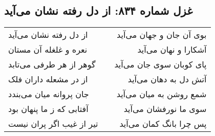 \begin{center}
\section*{غزل شماره ۸۳۴: از دل رفته نشان می‌آید}
\label{sec:0834}
\begin{longtable}{l p{0.5cm} r}
از دل رفته نشان می‌آید
&&
بوی آن جان و جهان می‌آید
\\
نعره و غلغله آن مستان
&&
آشکارا و نهان می‌آید
\\
گوهر از هر طرفی می‌تابد
&&
پای کوبان سوی جان می‌آید
\\
از در مشعله داران فلک
&&
آتش دل به دهان می‌آید
\\
جان پروانه میان می‌بندد
&&
شمع روشن به میان می‌آید
\\
آفتابی که ز ما پنهان بود
&&
سوی ما نورفشان می‌آید
\\
تیر از غیب اگر پران نیست
&&
پس چرا بانگ کمان می‌آید
\\
\end{longtable}
\end{center}
